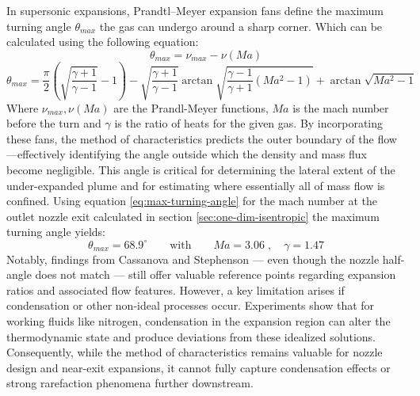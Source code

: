 		In supersonic expansions, Prandtl–Meyer expansion fans define the maximum turning angle $\theta_{max}$ the gas can undergo around a sharp corner.
		Which can be calculated using the following equation:
		\begin{equation*}
			\theta_{max} = \nu_{max} - \nu(Ma)
		\end{equation*}
		\begin{equation}
			\theta_{max} = \frac{\pi}{2} \left(\sqrt{\frac{\gamma + 1}{\gamma - 1}} - 1\right) - \sqrt{\frac{\gamma + 1}{\gamma - 1}}\arctan{\sqrt{\frac{\gamma - 1}{\gamma + 1}(Ma^2 - 1)}} + \arctan{\sqrt{Ma^2 -1}}
			\label{eq:max-turning-angle}
		\end{equation}
		Where $\nu_{max},\nu(Ma)$ are the Prandl-Meyer functions, $Ma$ is the mach number before the turn and $\gamma$ is the ratio of heats for the given gas.
		By incorporating these fans, the method of characteristics predicts the outer boundary of the flow—effectively identifying the angle outside which the density and mass flux become negligible.
		This angle is critical for determining the lateral extent of the under-expanded plume and for estimating where essentially all of mass flow is confined.
		Using equation \eqref{eq:max-turning-angle} for the mach number at the outlet nozzle exit calculated in section \ref{sec:one-dim-isentropic} the maximum turning angle yields:
		$$
			\theta_{max} = 68.9^\circ
			\qquad \text{with} \qquad
			Ma = 3.06\;,\quad \gamma = 1.47
		$$
		Notably, findings from Cassanova and Stephenson \cite{Cassanova1965} — even though the nozzle half-angle does not match — still offer valuable reference points regarding expansion ratios and associated flow features.
		However, a key limitation arises if condensation or other non-ideal processes occur.
		Experiments show that for working fluids like nitrogen, condensation in the expansion region can alter the thermodynamic state and produce deviations from these idealized solutions.
		Consequently, while the method of characteristics remains valuable for nozzle design and near-exit expansions, it cannot fully capture condensation effects or strong rarefaction phenomena further downstream.
		\cite{jousten_handbook_2016, robertson_investigation_1970, noauthor_zucrow_nodate}

